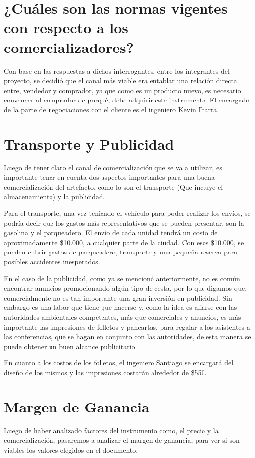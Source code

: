 \documentclass{report}
\begin{document}
    \section{¿Cuáles son las normas vigentes con respecto a los comercializadores?}

    Con base en las respuestas a dichos interrogantes, entre los integrantes del proyecto, se decidió que el canal más viable era entablar una relación directa entre, vendedor y comprador, ya que como es un producto nuevo, es necesario convencer al comprador de porqué, debe adquirir este instrumento. El encargado de la parte de negociaciones con el cliente es el ingeniero Kevin Ibarra.
    
    \section{Transporte y Publicidad}
    Luego de tener claro el canal de comercialización que se va a utilizar, es importante tener en cuenta dos aspectos importantes para una buena comercialización del artefacto, como lo son el transporte (Que incluye el almacenamiento) y la publicidad.
    
    Para el transporte, una vez teniendo el vehículo para poder realizar los envíos, se podría decir que los gastos más representativos que se pueden presentar, son la gasolina y el parqueadero. El envío de cada unidad tendrá un costo de aproximadamente \$10.000, a cualquier parte de la ciudad. Con esos \$10.000, se pueden cubrir gastos de parqueadero, transporte y una pequeña reserva para posibles accidentes inesperados.
    
    En el caso de la publicidad, como ya se mencionó anteriormente, no es común encontrar anuncios promocionando algún tipo de cesta, por lo que digamos que, comercialmente no es tan importante una gran inversión en publicidad. Sin embargo es una labor que tiene que hacerse y, como la idea es aliarse con las autoridades ambientales competentes, más que comerciales  y anuncios, es más importante las impresiones de folletos y pancartas, para regalar a los asistentes a las conferencias, que se hagan en conjunto con las autoridades, de esta manera se puede obtener un buen alcance publicitario.
    
    En cuanto a los costos de los folletos, el ingeniero Santiago se encargará del diseño de los mismos y las impresiones costarán alrededor de \$550.
    
    \section{Margen de Ganancia}
    Luego de haber analizado factores del instrumento como, el precio y la comercialización, pasaremos a analizar el margen de ganancia, para ver si son viables los valores elegidos en el documento.
    
\end{document}
